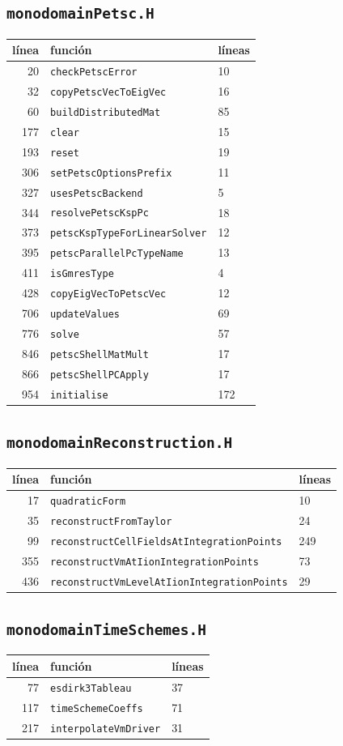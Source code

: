 \documentclass[11pt,a4paper]{article}
\begin{document}
\subsection*{\texttt{monodomainPetsc.H}}
\begin{longtable}{rll}
\toprule
línea & función & líneas \\
\midrule
\endhead
20 & \texttt{checkPetscError} & 10 \\
32 & \texttt{copyPetscVecToEigVec} & 16 \\
60 & \texttt{buildDistributedMat} & 85 \\
177 & \texttt{clear} & 15 \\
193 & \texttt{reset} & 19 \\
306 & \texttt{setPetscOptionsPrefix} & 11 \\
327 & \texttt{usesPetscBackend} & 5 \\
344 & \texttt{resolvePetscKspPc} & 18 \\
373 & \texttt{petscKspTypeForLinearSolver} & 12 \\
395 & \texttt{petscParallelPcTypeName} & 13 \\
411 & \texttt{isGmresType} & 4 \\
428 & \texttt{copyEigVecToPetscVec} & 12 \\
706 & \texttt{updateValues} & 69 \\
776 & \texttt{solve} & 57 \\
846 & \texttt{petscShellMatMult} & 17 \\
866 & \texttt{petscShellPCApply} & 17 \\
954 & \texttt{initialise} & 172 \\
\bottomrule
\end{longtable}
\subsection*{\texttt{monodomainReconstruction.H}}
\begin{longtable}{rll}
\toprule
línea & función & líneas \\
\midrule
\endhead
17 & \texttt{quadraticForm} & 10 \\
35 & \texttt{reconstructFromTaylor} & 24 \\
99 & \texttt{reconstructCellFieldsAtIntegrationPoints} & 249 \\
355 & \texttt{reconstructVmAtIionIntegrationPoints} & 73 \\
436 & \texttt{reconstructVmLevelAtIionIntegrationPoints} & 29 \\
\bottomrule
\end{longtable}
\subsection*{\texttt{monodomainTimeSchemes.H}}
\begin{longtable}{rll}
\toprule
línea & función & líneas \\
\midrule
\endhead
77 & \texttt{esdirk3Tableau} & 37 \\
117 & \texttt{timeSchemeCoeffs} & 71 \\
217 & \texttt{interpolateVmDriver} & 31 \\
\bottomrule
\end{longtable}
\end{document}
